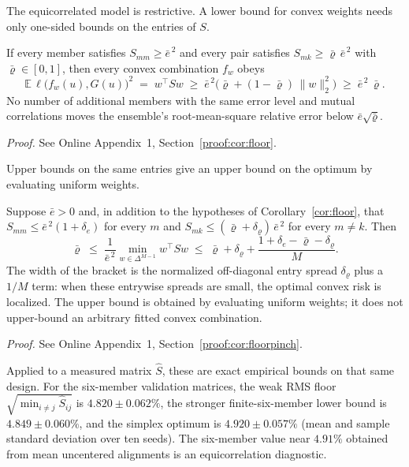 \documentclass[twoside,11pt]{article}
\begin{document}
The equicorrelated model is restrictive. A lower bound for convex weights
needs only one-sided bounds on the entries of $S$.

\begin{corollary}\label{cor:floor}
If every member satisfies $S_{mm}\ge\bar e^{\,2}$ and every pair satisfies
$S_{mk}\ge\bar\varrho\,\bar e^{\,2}$ with $\bar\varrho\in[0,1]$, then every
convex combination $f_w$ obeys
\[
\mathbb E\,\ell\big(f_w(u),G(u)\big)^2\;=\;w^\top Sw\;\ge\;
\bar e^{\,2}\big(\bar\varrho+(1-\bar\varrho)\,\|w\|_2^2\big)\;\ge\;
\bar e^{\,2}\,\bar\varrho .
\]
No number of additional members with the same error level and mutual
correlations moves the ensemble's root-mean-square relative error below
$\bar e\sqrt{\bar\varrho}$.
\end{corollary}
\noindent\emph{Proof.} See Online Appendix~1, Section~\ref{proof:cor:floor}.


Upper bounds on the same entries give an upper bound on the optimum by
evaluating uniform weights.

\begin{corollary}\label{cor:floorpinch}
Suppose $\bar e>0$ and, in addition to the hypotheses of Corollary~\ref{cor:floor}, that
$S_{mm}\le\bar e^{\,2}(1+\delta_e)$ for every $m$ and
$S_{mk}\le(\bar\varrho+\delta_\varrho)\,\bar e^{\,2}$ for every $m\neq k$.
Then
\[
\bar\varrho\;\le\;\frac{1}{\bar e^{\,2}}\min_{w\in\Delta^{M-1}}w^\top Sw
\;\le\;\bar\varrho+\delta_\varrho+\frac{1+\delta_e-\bar\varrho-\delta_\varrho}{M}.
\]
The width of the bracket is the normalized off-diagonal entry spread
$\delta_\varrho$ plus a $1/M$ term: when these entrywise spreads are small, the optimal convex risk is localized. The upper bound is obtained by evaluating uniform weights; it does not upper-bound an arbitrary fitted convex combination.
\end{corollary}
\noindent\emph{Proof.} See Online Appendix~1, Section~\ref{proof:cor:floorpinch}.


Applied to a measured matrix $\widehat S$, these are exact empirical bounds on that same design. For the six-member validation matrices, the weak RMS floor $\sqrt{\min_{i\ne j}\widehat S_{ij}}$ is $4.820\pm0.062\%$, the stronger finite-six-member lower bound is $4.849\pm0.060\%$, and the simplex optimum is $4.920\pm0.057\%$ (mean and sample standard deviation over ten seeds). The six-member value near $4.91\%$ obtained from mean uncentered alignments is an equicorrelation diagnostic.
\end{document}

